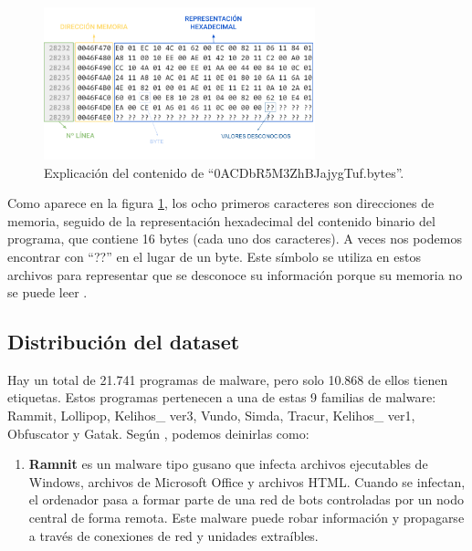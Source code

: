 \begin{figure}[h]
    \begin{center}
    \includegraphics[width=0.7\textwidth]{img/previewMMC.png}
    \end{center}
    \caption{Explicación del contenido de ``0ACDbR5M3ZhBJajygTuf.bytes''.}
    \label{fig:previewMMC}
\end{figure} 


Como aparece en la figura \ref{fig:previewMMC}, los ocho primeros caracteres son direcciones de memoria, seguido de la representación hexadecimal del contenido binario del programa, que contiene 16 bytes (cada uno dos caracteres). A veces nos podemos encontrar con ``??'' en el lugar de un byte. Este símbolo se utiliza en estos archivos para representar que se desconoce su información porque su memoria no se puede leer \citep{cahyani2022influence}. 


\subsection{Distribución del dataset}

Hay un total de 21.741 programas de malware, pero solo 10.868 de ellos tienen etiquetas. Estos programas pertenecen a una de estas 9 familias de malware: Rammit, Lollipop, Kelihos\_ ver3, Vundo, Simda, Tracur, Kelihos\_ ver1, Obfuscator y Gatak. Según \cite{hu2019machine}, podemos deinirlas como: 

  

\begin{enumerate}

\item \textbf{Ramnit} es un malware tipo gusano que infecta archivos ejecutables de Windows, archivos de Microsoft Office y archivos HTML. Cuando se infectan, el ordenador pasa a formar parte de una red de bots controladas por un nodo central de forma remota. Este malware puede robar información y propagarse a través de conexiones de red y unidades extraíbles.

\end{enumerate}


